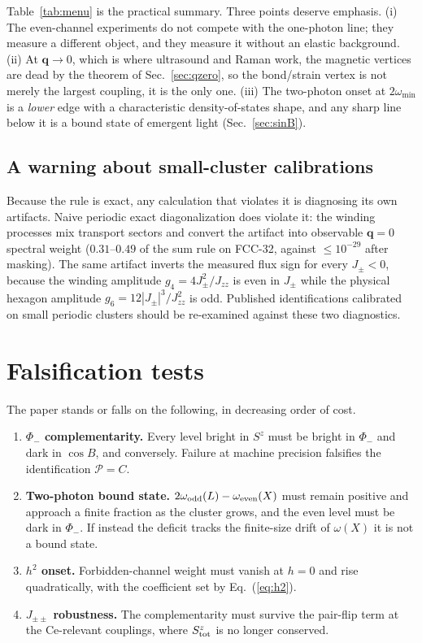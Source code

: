 \documentclass[aps,prl,preprint,amsmath,amssymb,superscriptaddress,
longbibliography,floatfix]{revtex4-2}
\newcommand{\Jzz}{J_{zz}}
\newcommand{\Jpm}{J_{\pm}}
\newcommand{\Jpmpm}{J_{\pm\pm}}
\DeclareRobustCommand{\bq}{\bm q}
\newcommand{\PP}{\mathcal{P}}
\begin{document}
Table~\ref{tab:menu} is the practical summary.  Three points deserve emphasis.
(i) The even-channel experiments do not compete with the one-photon line; they
measure a different object, and they measure it without an elastic background.
(ii) At $\bq\to0$, which is where ultrasound and Raman work, the magnetic
vertices are dead by the theorem of Sec.~\ref{sec:qzero}, so the bond/strain
vertex is not merely the largest coupling, it is the only one.  (iii) The
two-photon onset at $2\omega_{\min}$ is a \emph{lower} edge with a
characteristic density-of-states shape, and any sharp line below it is a bound
state of emergent light (Sec.~\ref{sec:sinB}).

\subsection{A warning about small-cluster calibrations}

Because the rule is exact, any calculation that violates it is diagnosing its
own artifacts.  Naive periodic exact diagonalization does violate it: the
winding processes mix transport sectors and convert the artifact into
observable $\bq=0$ spectral weight ($0.31$--$0.49$ of the sum rule on FCC-32,
against $\le10^{-29}$ after masking).  The same artifact inverts the measured
flux sign for every $\Jpm<0$, because the winding amplitude
$g_4=4\Jpm^2/\Jzz$ is even in $\Jpm$ while the physical hexagon amplitude
$g_6=12|\Jpm|^3/\Jzz^2$ is odd.  Published identifications calibrated on small
periodic clusters should be re-examined against these two diagnostics.

\section{Falsification tests}
\label{sec:tests}

The paper stands or falls on the following, in decreasing order of cost.

\begin{enumerate}
\item \textbf{$\Phi_-$ complementarity.}  Every level bright in $S^z$ must be
bright in $\Phi_-$ and dark in $\cos B$, and conversely.  Failure at machine
precision falsifies the identification $\PP=C$.
\item \textbf{Two-photon bound state.}  $2\omega_{\rm odd}(L)-\omega_{\rm
even}(X)$ must remain positive and approach a finite fraction as the cluster
grows, and the even level must be dark in $\Phi_-$.  If instead the deficit
tracks the finite-size drift of $\omega(X)$ it is not a bound state.
\item \textbf{$h^2$ onset.}  Forbidden-channel weight must vanish at $h=0$ and
rise quadratically, with the coefficient set by Eq.~(\ref{eq:h2}).
\item \textbf{$\Jpmpm$ robustness.}  The complementarity must survive the
pair-flip term at the Ce-relevant couplings, where $S^z_{\rm tot}$ is no longer
conserved.
\end{enumerate}
\end{document}
